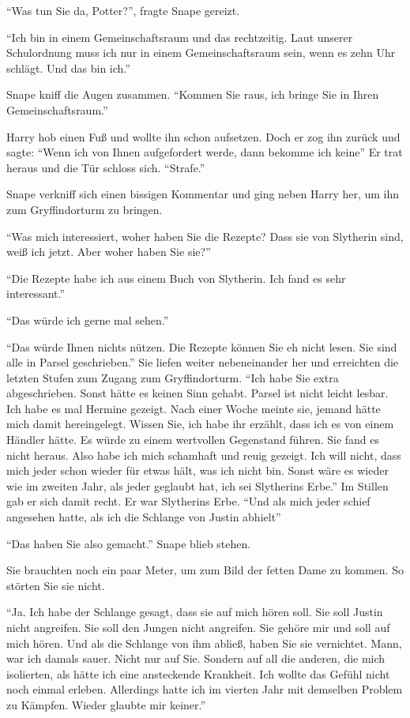 \enquote{Was tun Sie da, Potter?}, fragte Snape gereizt.

\enquote{Ich bin in einem Gemeinschaftsraum und das rechtzeitig. Laut unserer Schulordnung muss ich nur in einem Gemeinschaftsraum sein, wenn es zehn Uhr schlägt. Und das bin ich.}

Snape kniff die Augen zusammen. \enquote{Kommen Sie raus, ich bringe Sie in Ihren Gemeinschaftsraum.}

Harry hob einen Fuß und wollte ihn schon aufsetzen. Doch er zog ihn zurück und sagte: \enquote{Wenn ich von Ihnen aufgefordert werde, dann bekomme ich keine\abs} Er trat heraus und die Tür schloss sich. \enquote{\aabs Strafe.}

Snape verkniff sich einen bissigen Kommentar und ging neben Harry her, um ihn zum Gryffindorturm zu bringen.

\enquote{Was mich interessiert, woher haben Sie die Rezepte? Dass sie von Slytherin sind, weiß ich jetzt. Aber woher haben Sie sie?}

\enquote{Die Rezepte habe ich aus einem Buch von Slytherin. Ich fand es sehr interessant.}

\enquote{Das würde ich gerne mal sehen.}

\enquote{Das würde Ihnen nichts nützen. Die Rezepte können Sie eh nicht lesen. Sie sind alle in Parsel geschrieben.} Sie liefen weiter nebeneinander her und erreichten die letzten Stufen zum Zugang zum Gryffindorturm. \enquote{Ich habe Sie extra abgeschrieben. Sonst hätte es keinen Sinn gehabt. Parsel ist nicht leicht lesbar. Ich habe es mal Hermine gezeigt. Nach einer Woche meinte sie, jemand hätte mich damit hereingelegt. Wissen Sie, ich habe ihr erzählt, dass ich es von einem Händler hätte. Es würde zu einem wertvollen Gegenstand führen. Sie fand es nicht heraus. Also habe ich mich schamhaft und reuig gezeigt. Ich will nicht, dass mich jeder schon wieder für etwas hält, was ich nicht bin. Sonst wäre es wieder wie im zweiten Jahr, als jeder geglaubt hat, ich sei Slytherins Erbe.} Im Stillen gab er sich damit recht. Er war Slytherins Erbe. \enquote{Und als mich jeder schief angesehen hatte, als ich die Schlange von Justin abhielt\abs}

\enquote{Das haben Sie also gemacht.} Snape blieb stehen.

Sie brauchten noch ein paar Meter, um zum Bild der fetten Dame zu kommen. So störten Sie sie nicht.

\enquote{Ja. Ich habe der Schlange gesagt, dass sie auf mich hören soll. Sie soll Justin nicht angreifen. Sie soll den Jungen nicht angreifen. Sie gehöre mir und soll auf mich hören. Und als die Schlange von ihm abließ, haben Sie sie vernichtet. Mann, war ich damals sauer. Nicht nur auf Sie. Sondern auf all die anderen, die mich isolierten, als hätte ich eine ansteckende Krankheit. Ich wollte das Gefühl nicht noch einmal erleben. Allerdings hatte ich im vierten Jahr mit demselben Problem zu Kämpfen. Wieder glaubte mir keiner.}

